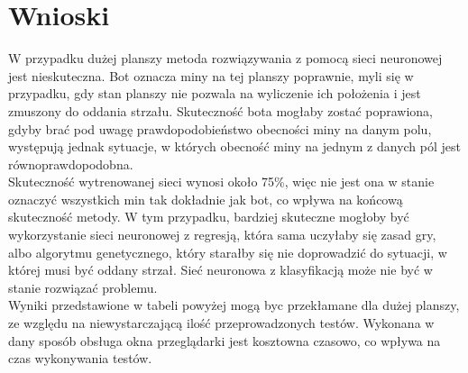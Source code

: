 \documentclass[letterpaper,12pt]{article}
\begin{document}
\section{Wnioski}
W przypadku dużej planszy metoda rozwiązywania z pomocą sieci neuronowej jest nieskuteczna. Bot oznacza miny na tej planszy poprawnie, 
myli się w przypadku, gdy stan planszy nie pozwala na wyliczenie ich położenia i jest zmuszony do oddania strzału. Skuteczność bota mogłaby zostać poprawiona, gdyby
brać pod uwagę prawdopodobieństwo obecności miny na danym polu, występują jednak sytuacje, w których obecność miny na jednym z danych pól jest równoprawdopodobna.\\
  Skuteczność wytrenowanej sieci
wynosi około 75\%, więc nie jest ona w stanie oznaczyć wszystkich min tak dokładnie jak bot, co wpływa na końcową skuteczność metody.
W tym przypadku, bardziej skuteczne mogłoby być wykorzystanie sieci neuronowej z regresją, która sama uczyłaby się zasad gry, albo algorytmu 
genetycznego, który starałby się nie doprowadzić do sytuacji, w której musi być oddany strzał. Sieć neuronowa z klasyfikacją może nie być w stanie rozwiązać problemu.\\
Wyniki przedstawione w tabeli powyżej mogą byc przekłamane dla dużej planszy, ze względu na niewystarczającą ilość
przeprowadzonych testów. Wykonana w dany sposób obsługa okna przeglądarki jest kosztowna czasowo, co wpływa na czas wykonywania testów.
\end{document}
